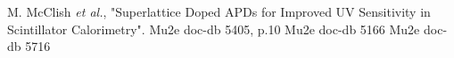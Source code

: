 

\begin{thebibliography}{9}

 M. McClish {\it et al.}, "Superlattice Doped APDs for Improved UV Sensitivity in Scintillator Calorimetry". 
 Mu2e doc-db 5405, p.10
 Mu2e doc-db 5166
 Mu2e doc-db 5716

\end{thebibliography}

